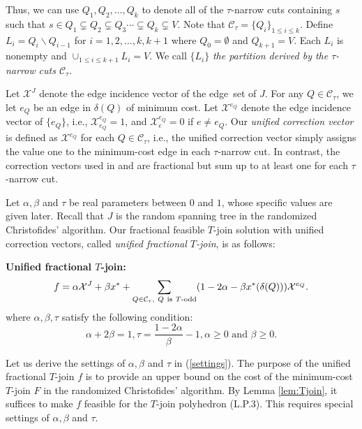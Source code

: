 \documentclass[11pt]{article}
\begin{document}
Thus, we can use $Q_1, Q_2, \ldots, Q_k$ to denote all of
the $\tau$-narrow cuts containing $s$ such that
$s\in Q_1 \subsetneq Q_2 \subsetneq Q_3 \cdots \subsetneq Q_k\subsetneq V$.
Note that $\mathcal{C}_\tau=\{Q_i\}_{1\leq i\leq k}$.
Define $L_i=Q_i\backslash Q_{i-1}$ for $i=1, 2, \ldots, k, k+1$
where $Q_0=\emptyset$ and $Q_{k+1}=V$.
Each $L_i$ is nonempty and $\cup_{1\leq i\leq k+1}L_i=V$.
We call $\{L_i\}$ \emph{the partition derived by
the $\tau$-narrow cuts $\mathcal{C}_\tau$}.

Let $\mathcal{X}^J$ denote the edge incidence vector of the edge~set of $J$.
For any $Q\in \mathcal{C}_\tau$, we let $e_{Q}$ be
an edge in $\delta(Q)$ of minimum cost.
Let $\mathcal{X}^{e_{Q}}$ denote the edge incidence vector of $\{e_{Q}\}$,
i.e., $\mathcal{X}^{e_{Q}}_{e_{Q}}=1$, and $\mathcal{X}^{e_{Q}}_{e}=0$ if $e\neq e_Q$.
Our \emph{unified correction vector} is defined as $\mathcal{X}^{e_{Q}}$ for each $Q\in \mathcal{C}_\tau$,
i.e., the unified correction vector simply assigns
the value one to the minimum-cost edge in each $\tau$-narrow cut. In contrast, the correction vectors used
in \cite{AKS12} and \cite{sebo13} are fractional but sum up to at least one for each $\tau$-narrow cut.


Let $\alpha, \beta$ and $\tau$ be real parameters between $0$ and $1$,
whose specific values are given later.
Recall that $J$ is the random spanning tree in the
randomized Christofides' algorithm. Our fractional feasible $T$-join solution with unified correction
vectors, called \emph{unified fractional $T$-join}, is as follows:


\medskip

\noindent \textbf{Unified fractional $T$-join: }	
\[ f=\alpha \mathcal{X}^J + \beta x^* + \sum_{Q\in \mathcal{C}_\tau,\ Q\ \textnormal{is} \ T\textnormal{-odd}}
	(1-2\alpha - \beta x^*(\delta(Q)))\mathcal{X}^{e_{Q}}.
\]
where $\alpha, \beta, \tau$ satisfy the following condition:
\begin{equation}\label{settings}
\alpha+2\beta=1, \tau=\frac{1-2\alpha}{\beta}-1, \alpha\geq 0 \mbox{ and } \beta\geq 0.
\end{equation}

Let us derive the settings of $\alpha, \beta$ and $\tau$ in (\ref{settings}).
The purpose of the unified fractional $T$-join $f$ is to provide an upper bound on the cost of the minimum-cost $T$-join $F$ in the
randomized Christofides' algorithm. By Lemma \ref{lem:Tjoin}, it suffices to make $f$ feasible
for the $T$-join polyhedron (L.P.3). This requires special settings of $\alpha, \beta$ and $\tau$.
\end{document}
